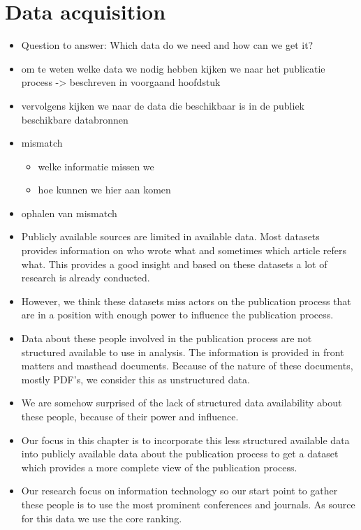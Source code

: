 \documentclass{ou-report}
\newcommand{\outline}[1]{{\color{blue} #1}}
\begin{document}
\chapter{Data acquisition}
\outline{
\begin{itemize}
    \item Question to answer: Which data do we need and how can we get it?
    \item om te weten welke data we nodig hebben kijken we naar het publicatie process -> beschreven in voorgaand hoofdstuk
    \item vervolgens kijken we naar de data die beschikbaar is in de publiek beschikbare databronnen
    \item mismatch
    \begin{itemize}
        \item welke informatie missen we
        \item hoe kunnen we hier aan komen
    \end{itemize}
    \item ophalen van mismatch
\end{itemize}
\begin{itemize}
    \item Publicly available sources are limited in available data. Most datasets provides information on who wrote what and sometimes which article refers what. This provides a good insight and based on these datasets a lot of research is already conducted.
    \item However, we think these datasets miss actors on the publication process that are in a position with enough power to influence the publication process.
    \item Data about these people involved in the publication process are not structured available to use in analysis. The information is provided in front matters and masthead documents. Because of the nature of these documents, mostly PDF's, we consider this as unstructured data.
    \item We are somehow surprised of the lack of structured data availability about these people, because of their power and influence.
    \item Our focus in this chapter is to incorporate this less structured available data into publicly available data about the publication process to get a dataset which provides a more complete view of the publication process.
    \item Our research focus on information technology so our start point to gather these people is to use the most prominent conferences and journals. As source for this data we use the core ranking.
\end{itemize}
}
\end{document}
